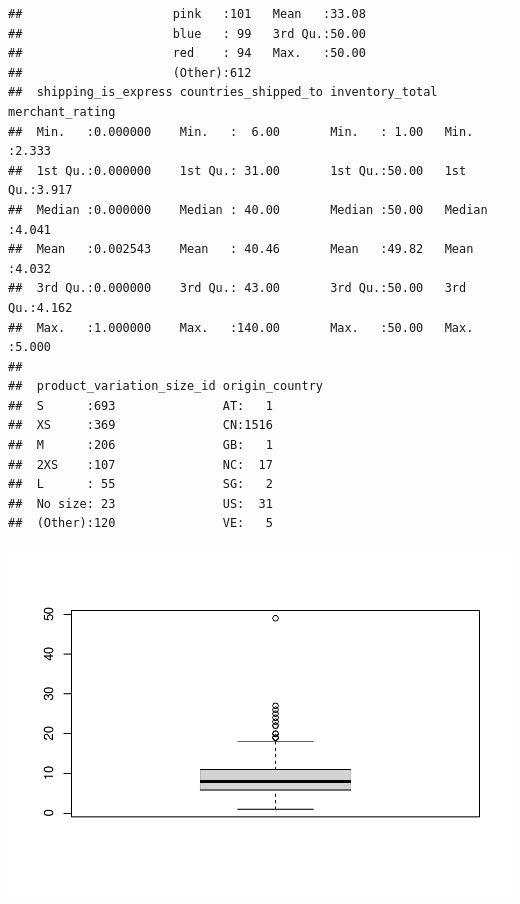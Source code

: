 \documentclass[
]{article}
\newenvironment{Shaded}{\begin{snugshade}}{\end{snugshade}}
\newcommand{\KeywordTok}[1]{\textcolor[rgb]{0.13,0.29,0.53}{\textbf{#1}}}
\newcommand{\NormalTok}[1]{#1}
\newcommand{\OperatorTok}[1]{\textcolor[rgb]{0.81,0.36,0.00}{\textbf{#1}}}
\begin{document}
\begin{verbatim}
##                     pink   :101   Mean   :33.08              
##                     blue   : 99   3rd Qu.:50.00              
##                     red    : 94   Max.   :50.00              
##                     (Other):612                              
##  shipping_is_express countries_shipped_to inventory_total merchant_rating
##  Min.   :0.000000    Min.   :  6.00       Min.   : 1.00   Min.   :2.333  
##  1st Qu.:0.000000    1st Qu.: 31.00       1st Qu.:50.00   1st Qu.:3.917  
##  Median :0.000000    Median : 40.00       Median :50.00   Median :4.041  
##  Mean   :0.002543    Mean   : 40.46       Mean   :49.82   Mean   :4.032  
##  3rd Qu.:0.000000    3rd Qu.: 43.00       3rd Qu.:50.00   3rd Qu.:4.162  
##  Max.   :1.000000    Max.   :140.00       Max.   :50.00   Max.   :5.000  
##                                                                          
##  product_variation_size_id origin_country
##  S      :693               AT:   1       
##  XS     :369               CN:1516       
##  M      :206               GB:   1       
##  2XS    :107               NC:  17       
##  L      : 55               SG:   2       
##  No size: 23               US:  31       
##  (Other):120               VE:   5
\end{verbatim}

\begin{Shaded}
\end{Shaded}

\includegraphics{PRAC2_Limpieza_Analisis_Datos---Sales_files/figure-latex/unnamed-chunk-15-1.pdf}
\end{document}
